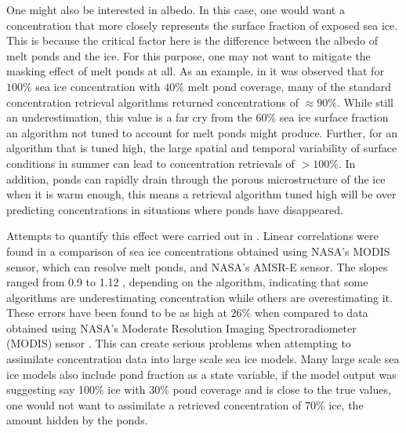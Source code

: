 \par One might also be interested in albedo. In this case, one would want a concentration that more closely represents the surface fraction of exposed sea ice. This is because the critical factor here is the difference between the albedo of melt ponds and the ice. For this purpose, one may not want to mitigate the masking effect of melt ponds at all. As an example, in \cite{Kern2016} it was observed that for $100\%$ sea ice concentration with $40\%$ melt pond coverage, many of the standard concentration retrieval algorithms returned concentrations of $\approx 90\%$. While still an underestimation, this value is a far cry from the 60\% sea ice surface fraction an algorithm not tuned to account for melt ponds might produce. Further,  for an algorithm that is tuned high, the large spatial and temporal variability of surface conditions in summer can lead to concentration retrievals of $>100\%$. In addition, ponds can rapidly drain through the porous microstructure of the ice when it is warm enough, this means a retrieval algorithm tuned high will be over predicting concentrations in situations where ponds have disappeared. 

\par Attempts to quantify this effect were carried out in \cite{Kern2016}. Linear correlations were found in a comparison of sea ice concentrations obtained using NASA's MODIS sensor, which can resolve melt ponds, and NASA's AMSR-E sensor. The slopes ranged from 0.9 to 1.12 , depending on the algorithm, indicating that some algorithms are underestimating concentration while others are overestimating it. These errors have been found to be as high at $26\%$ when compared to data obtained using NASA's Moderate Resolution Imaging Spectroradiometer (MODIS) sensor \cite{Kern2016}. This can create serious problems when attempting to assimilate concentration data into large scale sea ice models. Many large scale sea ice models also include pond fraction as a state variable, if the model output was suggesting say 100\% ice with 30\% pond coverage and is close to the true values, one would not want to assimilate a retrieved concentration of 70\% ice, the amount hidden by the ponds.

